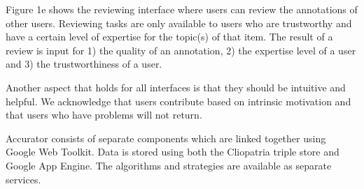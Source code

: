 Figure 1e shows the reviewing interface where users can review the annotations of other users. Reviewing tasks are only available to users who are trustworthy and have a certain level of expertise for the topic(s) of that item. The result of a review is input for 1) the quality of an annotation, 2) the expertise level of a user and 3) the trustworthiness of a user.

Another aspect that holds for all interfaces is that they should be intuitive and helpful. We acknowledge that users contribute based on intrinsic motivation and that users who have problems will not return. 

Accurator consists of separate components which are linked together using Google Web Toolkit. Data is stored using both the Cliopatria triple store and Google App Engine. The algorithms and strategies are available as separate services. 



